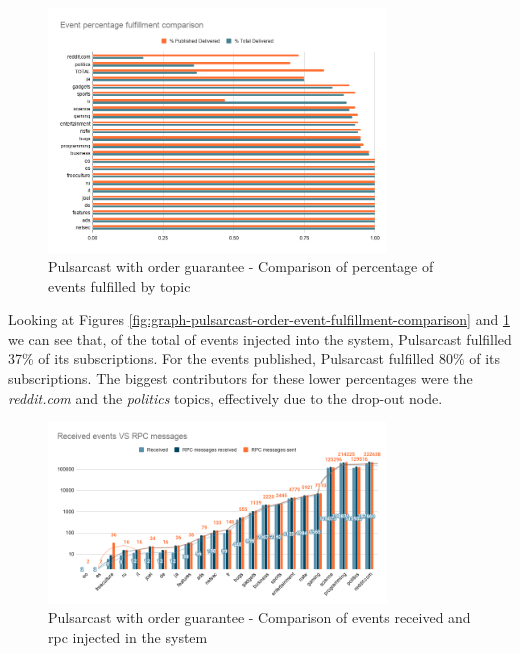 \begin{figure}[!htb]
  \centering
  \includegraphics[width=0.8\textwidth]{img/graph-pulsarcast-order-event-percentage-fulfillment-comparison.png}
  \caption{Pulsarcast with order guarantee - Comparison of percentage of events fulfilled by topic}
  \label{fig:graph-pulsarcast-order-event-percentage-fulfillment-comparison}
\end{figure}

Looking at Figures
\ref{fig:graph-pulsarcast-order-event-fulfillment-comparison} and
\ref{fig:graph-pulsarcast-order-event-percentage-fulfillment-comparison} we can
see that, of the total of events injected into the system, Pulsarcast fulfilled
37\% of its subscriptions. For the events published, Pulsarcast fulfilled 80\%
of its subscriptions. The biggest contributors for these lower percentages were
the \emph{reddit.com} and the \emph{politics} topics, effectively due to the
drop-out node.

\begin{figure}[!htb]
  \centering
  \includegraphics[width=0.8\textwidth]{img/graph-pulsarcast-order-rpc.png}
  \caption{Pulsarcast with order guarantee - Comparison of events received and \acrshort{rpc} injected in the system}
  \label{fig:graph-pulsarcast-order-rpc}
\end{figure}


